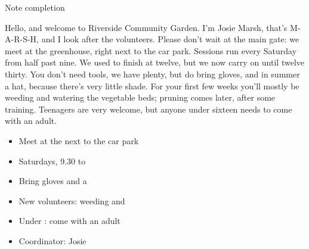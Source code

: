 \documentclass{tutordesk}
\begin{document}
\begin{exercise}[tag=IELTS Listening]{Note completion}

\begin{teachernote}
Hello, and welcome to Riverside Community Garden. I'm Josie Marsh, that's M-A-R-S-H, and
I look after the volunteers. Please don't wait at the main gate: we meet at the greenhouse,
right next to the car park. Sessions run every Saturday from half past nine. We used to
finish at twelve, but we now carry on until twelve thirty. You don't need tools, we have
plenty, but do bring gloves, and in summer a hat, because there's very little shade. For your
first few weeks you'll mostly be weeding and watering the vegetable beds; pruning comes
later, after some training. Teenagers are very welcome, but anyone under sixteen needs to
come with an adult.
\end{teachernote}

\begin{gapfill}
\begin{twocol}
\begin{itemize}[leftmargin=1.1em,itemsep=4pt]
  \item Meet at the  next to the car park
  \item Saturdays, 9.30 to 
  \item Bring gloves and a 
  \item New volunteers: weeding and 
  \item Under : come with an adult
  \item Coordinator: Josie 
\end{itemize}
\end{twocol}
\end{gapfill}
\end{exercise}
\end{document}
